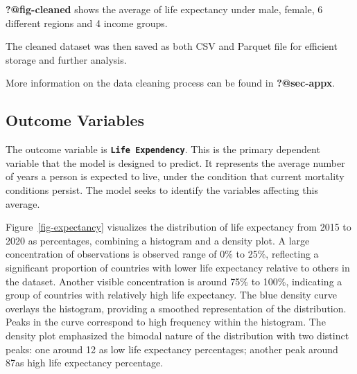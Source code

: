 \documentclass[
  letterpaper,
  DIV=11,
  numbers=noendperiod]{scrartcl}
\begin{document}
\textbf{?@fig-cleaned} shows the average of life expectancy under male,
female, 6 different regions and 4 income groups.

The cleaned dataset was then saved as both CSV and Parquet file for
efficient storage and further analysis.

More information on the data cleaning process can be found in
\textbf{?@sec-appx}.

\subsection{Outcome Variables}\label{outcome-variables}

The outcome variable is \textbf{\texttt{Life\ Expendency}}. This is the
primary dependent variable that the model is designed to predict. It
represents the average number of years a person is expected to live,
under the condition that current mortality conditions persist. The model
seeks to identify the variables affecting this average.

Figure~\ref{fig-expectancy} visualizes the distribution of life
expectancy from 2015 to 2020 as percentages, combining a histogram and a
density plot. A large concentration of observations is observed range of
0\% to 25\%, reflecting a significant proportion of countries with lower
life expectancy relative to others in the dataset. Another visible
concentration is around 75\% to 100\%, indicating a group of countries
with relatively high life expectancy. The blue density curve overlays
the histogram, providing a smoothed representation of the distribution.
Peaks in the curve correspond to high frequency within the histogram.
The density plot emphasized the bimodal nature of the distribution with
two distinct peaks: one around 12 as low life expectancy percentages;
another peak around 87as high life expectancy percentage.
\end{document}
